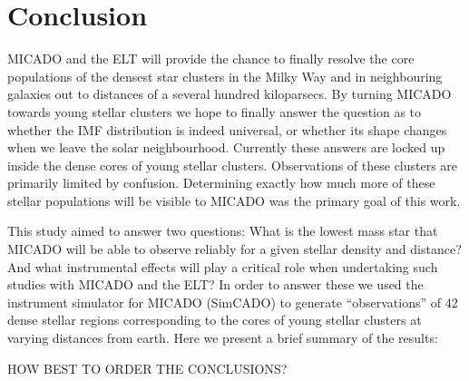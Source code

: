 \section{Conclusion}
\label{sec:conclusion}

MICADO and the ELT will provide the chance to finally resolve the core populations of the densest star clusters in the Milky Way and in neighbouring galaxies out to distances of a several hundred kiloparsecs. By turning MICADO towards young stellar clusters we hope to finally answer the question as to whether the IMF distribution is indeed universal, or whether its shape changes when we leave the solar neighbourhood. Currently these answers are locked up inside the dense cores of young stellar clusters. Observations of these clusters are primarily limited by confusion. Determining exactly how much more of these stellar populations will be visible to MICADO was the primary goal of this work.

This study aimed to answer two questions: What is the lowest mass star that MICADO will be able to observe reliably for a given stellar density and distance? And what instrumental effects will play a critical role when undertaking such studies with MICADO and the ELT? In order to answer these we used the instrument simulator for MICADO (SimCADO) to generate ``observations'' of 42 dense stellar regions corresponding to the cores of young stellar clusters at varying distances from earth. Here we present a brief summary of the results:

\rewrite HOW BEST TO ORDER THE CONCLUSIONS?

